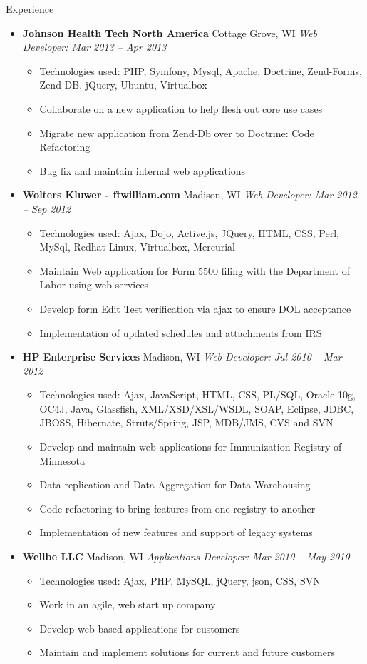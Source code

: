 \documentclass[11pt,oneside]{article}
\newenvironment{ressection}[1]{
	\vspace{4pt}
	{\fontfamily{phv}\selectfont\Large#1}
	\begin{itemize}
	\vspace{3pt}
}{
	\end{itemize}
}
\newcommand{\ressubitem}[1]{
	\vspace{-1pt}
	\item \begin{flushleft} #1 \end{flushleft}
}
\newcommand{\resbigitem}[3]{
	\vspace{-5pt}
	\item
	\textbf{#1} #2 \textit{#3}
}
\newenvironment{ressubsec}[3]{
	\resbigitem{#1}{#2}{#3}
	\vspace{-2pt}
	\begin{itemize}
}{
	\end{itemize}
}
\begin{document}
\begin{ressection}{Experience}

	\begin{ressubsec}{Johnson Health Tech North America}{Cottage Grove, WI}{Web Developer: Mar 2013 -- Apr 2013}
		\ressubitem{Technologies used: PHP, Symfony, Mysql, Apache, Doctrine, Zend-Forms, Zend-DB, jQuery, Ubuntu, Virtualbox } 
		\ressubitem{Collaborate on a new application to help flesh out core use cases }
		\ressubitem{Migrate new application from Zend-Db over to Doctrine: Code Refactoring}
		\ressubitem{Bug fix and maintain internal web applications}
	\end{ressubsec}

	\begin{ressubsec}{Wolters Kluwer - ftwilliam.com}{Madison, WI}{Web Developer: Mar 2012 -- Sep 2012}
		\ressubitem{Technologies used: Ajax, Dojo, Active.js, JQuery, HTML, CSS, Perl, MySql, Redhat Linux, Virtualbox, Mercurial}
		\ressubitem{Maintain Web application for Form 5500 filing with the Department of Labor using web services}
		\ressubitem{Develop form Edit Test verification via ajax to ensure DOL acceptance} 
		\ressubitem{Implementation of updated schedules and attachments from IRS}
	\end{ressubsec}

	\begin{ressubsec}{HP Enterprise Services}{Madison, WI}{Web Developer: Jul 2010 -- Mar 2012}
		\ressubitem{Technologies used: Ajax, JavaScript, HTML, CSS, PL/SQL, Oracle 10g, OC4J, Java, Glassfish, XML/XSD/XSL/WSDL, SOAP, Eclipse, JDBC, JBOSS, Hibernate, Struts/Spring, JSP, MDB/JMS, CVS and SVN}
		\ressubitem{Develop and maintain web applications for Immunization Registry of Minnesota}
		\ressubitem{Data replication and Data Aggregation for Data Warehousing} 
		\ressubitem{Code refactoring to bring features from one registry to another}
		\ressubitem{Implementation of new features and support of legacy systems}
	\end{ressubsec}

	\begin{ressubsec}{Wellbe LLC}{Madison, WI}{Applications Developer: Mar 2010 -- May 2010}
		\ressubitem{Technologies used: Ajax, PHP, MySQL, jQuery, json, CSS, SVN}
		\ressubitem{Work in an agile, web start up company}
		\ressubitem{Develop web based applications for customers}
		\ressubitem{Maintain and implement solutions for current and future customers}
	\end{ressubsec}	
	

\end{ressection}
\end{document}
